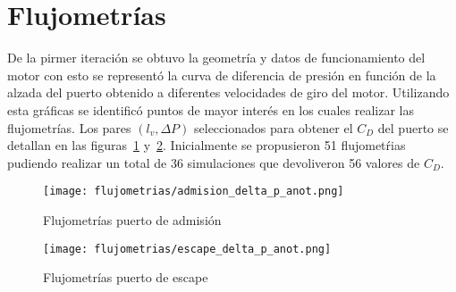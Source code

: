 \section{Flujometrías}

De la pirmer iteración se obtuvo la geometría y datos de funcionamiento del
motor con esto se representó la curva de diferencia de presión en función de la
alzada del puerto obtenido a diferentes velocidades de giro del motor.
%
Utilizando esta gráficas se identificó puntos de mayor interés en los cuales
realizar las flujometrías.
%
%
Los pares $(l_{v}, \Delta P)$ seleccionados para obtener el $C_{D}$ del puerto
se detallan en las figuras~\ref{fig:delta_p_admision}
y~\ref{fig:delta_p_escape}.
%
Inicialmente se propusieron 51 flujometŕias pudiendo realizar un total de 36
simulaciones que devoliveron 56 valores de $C_{D}$.

\begin{figure}[h]
  \centering
  \texttt{[image: flujometrias/admision\_delta\_p\_anot.png]}
  \caption{Flujometrías puerto de admisión}\label{fig:delta_p_admision}
\end{figure}

\begin{figure}[h]
  \centering
  \texttt{[image: flujometrias/escape\_delta\_p\_anot.png]}
  \caption{Flujometrías puerto de escape}\label{fig:delta_p_escape}
\end{figure}




